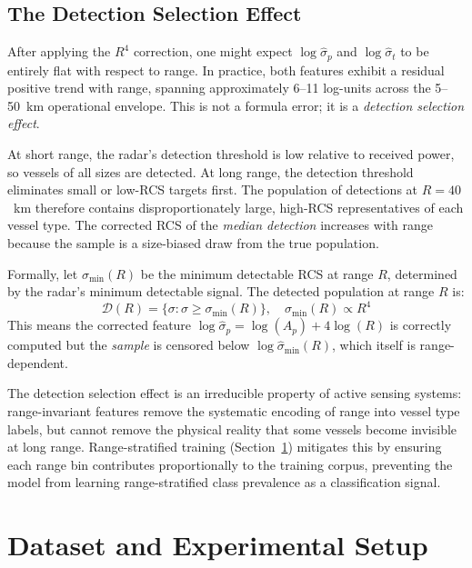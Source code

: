 \documentclass[journal]{IEEEtran}
\begin{document}
\subsection{The Detection Selection Effect}
\label{sec:selection}

After applying the $R^4$ correction, one might expect $\log\hat{\sigma}_p$
and $\log\hat{\sigma}_t$ to be entirely flat with respect to range. In
practice, both features exhibit a residual positive trend with range,
spanning approximately 6--11 log-units across the 5--50~km operational
envelope. This is not a formula error; it is a \emph{detection
selection effect}.

At short range, the radar's detection threshold is low relative to
received power, so vessels of all sizes are detected. At long range,
the detection threshold eliminates small or low-RCS targets first. The
population of detections at $R = 40$~km therefore contains
disproportionately large, high-RCS representatives of each vessel type.
The corrected RCS of the \emph{median detection} increases with range
because the sample is a size-biased draw from the true population.

Formally, let $\sigma_{\min}(R)$ be the minimum detectable RCS at
range $R$, determined by the radar's minimum detectable signal. The
detected population at range $R$ is:
\begin{equation}
  \mathcal{D}(R) = \{ \sigma : \sigma \geq \sigma_{\min}(R) \},
  \quad \sigma_{\min}(R) \propto R^4
  \label{eq:detection_floor}
\end{equation}
This means the corrected feature $\log\hat{\sigma}_p = \log(A_p) + 4\log(R)$
is correctly computed but the \emph{sample} is censored below
$\log\hat{\sigma}_{\min}(R)$, which itself is range-dependent.

The detection selection effect is an irreducible property of active
sensing systems: range-invariant features remove the systematic
encoding of range into vessel type labels, but cannot remove the
physical reality that some vessels become invisible at long range.
Range-stratified training (Section~\ref{sec:data}) mitigates this by
ensuring each range bin contributes proportionally to the training
corpus, preventing the model from learning range-stratified class
prevalence as a classification signal.

\section{Dataset and Experimental Setup}
\label{sec:data}
\end{document}
